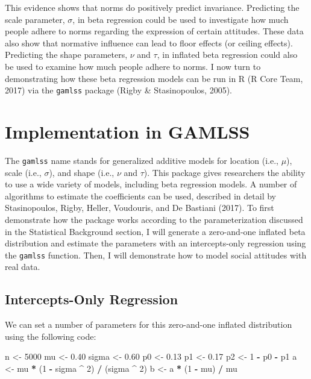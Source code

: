 \documentclass[english,,man]{apa6}
\newenvironment{Shaded}{\begin{snugshade}}{\end{snugshade}}
\newcommand{\DecValTok}[1]{\textcolor[rgb]{0.00,0.00,0.81}{#1}}
\newcommand{\FloatTok}[1]{\textcolor[rgb]{0.00,0.00,0.81}{#1}}
\newcommand{\NormalTok}[1]{#1}
\newcommand{\OperatorTok}[1]{\textcolor[rgb]{0.81,0.36,0.00}{\textbf{#1}}}
\newcommand{\StringTok}[1]{\textcolor[rgb]{0.31,0.60,0.02}{#1}}
\begin{document}
This evidence shows that norms do positively predict invariance. Predicting the scale parameter, \(\sigma\), in beta regression could be used to investigate how much people adhere to norms regarding the expression of certain attitudes. These data also show that normative influence can lead to floor effects (or ceiling effects). Predicting the shape parameters, \(\nu\) and \(\tau\), in inflated beta regression could also be used to examine how much people adhere to norms. I now turn to demonstrating how these beta regression models can be run in R (R Core Team, 2017) via the \texttt{gamlss} package (Rigby \& Stasinopoulos, 2005).

\hypertarget{implementation-in-gamlss}{%
\section{Implementation in GAMLSS}\label{implementation-in-gamlss}}

The \texttt{gamlss} name stands for generalized additive models for location (i.e., \(\mu\)), scale (i.e., \(\sigma\)), and shape (i.e., \(\nu\) and \(\tau\)). This package gives researchers the ability to use a wide variety of models, including beta regression models. A number of algorithms to estimate the coefficients can be used, described in detail by Stasinopoulos, Rigby, Heller, Voudouris, and De Bastiani (2017). To first demonstrate how the package works according to the parameterization discussed in the Statistical Background section, I will generate a zero-and-one inflated beta distribution and estimate the parameters with an intercepts-only regression using the \texttt{gamlss} function. Then, I will demonstrate how to model social attitudes with real data.

\hypertarget{intercepts-only-regression}{%
\subsection{Intercepts-Only Regression}\label{intercepts-only-regression}}

We can set a number of parameters for this zero-and-one inflated distribution using the following code:

\begin{Shaded}
\begin{Highlighting}[]
\NormalTok{n <-}\StringTok{ }\DecValTok{5000}
\NormalTok{mu <-}\StringTok{ }\FloatTok{0.40}
\NormalTok{sigma <-}\StringTok{ }\FloatTok{0.60}
\NormalTok{p0 <-}\StringTok{ }\FloatTok{0.13}
\NormalTok{p1 <-}\StringTok{ }\FloatTok{0.17}
\NormalTok{p2 <-}\StringTok{ }\DecValTok{1} \OperatorTok{-}\StringTok{ }\NormalTok{p0 }\OperatorTok{-}\StringTok{ }\NormalTok{p1}
\NormalTok{a <-}\StringTok{ }\NormalTok{mu }\OperatorTok{*}\StringTok{ }\NormalTok{(}\DecValTok{1} \OperatorTok{-}\StringTok{ }\NormalTok{sigma }\OperatorTok{^}\StringTok{ }\DecValTok{2}\NormalTok{) }\OperatorTok{/}\StringTok{ }\NormalTok{(sigma }\OperatorTok{^}\StringTok{ }\DecValTok{2}\NormalTok{)}
\NormalTok{b <-}\StringTok{ }\NormalTok{a }\OperatorTok{*}\StringTok{ }\NormalTok{(}\DecValTok{1} \OperatorTok{-}\StringTok{ }\NormalTok{mu) }\OperatorTok{/}\StringTok{ }\NormalTok{mu}
\end{Highlighting}
\end{Shaded}
\end{document}
